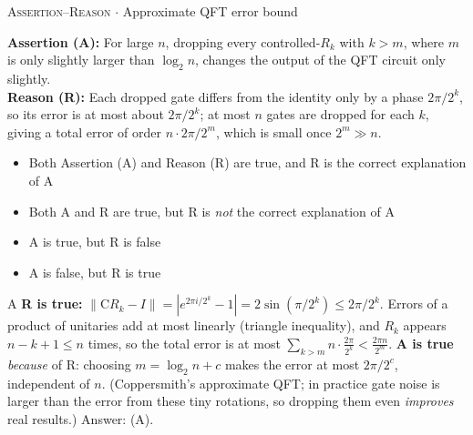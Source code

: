 \documentclass[11pt,a4paper]{article}
\newcommand{\optlabel}[1]{\textbf{(#1)}}
\newcommand{\correctlabel}[1]{\textcolor{okgreen}{\textbf{(#1)}\,\ding{51}}}
\newenvironment{qitem}[1]{\begin{list}{}{\setlength{\leftmargin}{3.3em}\setlength{\labelwidth}{3.1em}%
  \setlength{\labelsep}{0.2em}\setlength{\topsep}{3pt}\setlength{\parsep}{3pt}}\item[\textbf{Q.#1}\hfill]}{\end{list}}
\newcommand{\qsep}{\par\vspace{2pt}{\color{black!15}\hrule}\vspace{4pt}}
\newcommand{\qmeta}[2]{{\footnotesize\color{black!60}\textsc{#1} \;$\cdot$\; #2}\par}
\begin{document}
\begin{qitem}{77}
\qmeta{Assertion--Reason}{Approximate QFT error bound}
\textbf{Assertion (A):} For large $n$, dropping every controlled-$R_k$ with $k > m$, where $m$ is only slightly larger than
$\log_2 n$, changes the output of the QFT circuit only slightly.\\[1mm]
\textbf{Reason (R):} Each dropped gate differs from the identity only by a phase $2\pi/2^{k}$, so its error is at most about
$2\pi/2^{k}$; at most $n$ gates are dropped for each $k$, giving a total error of order $n\cdot 2\pi/2^{m}$, which is small once
$2^m \gg n$.
\begin{itemize}[leftmargin=2.6em, labelsep=0.4em, itemsep=2pt, topsep=3pt]
\item[\correctlabel{A}] Both Assertion (A) and Reason (R) are true, and R is the correct explanation of A
\item[\optlabel{B}] Both A and R are true, but R is \emph{not} the correct explanation of A
\item[\optlabel{C}] A is true, but R is false
\item[\optlabel{D}] A is false, but R is true
\end{itemize}
\end{qitem}
\begin{solbox}{A}
\textbf{R is true:} $\|\mathrm{C}R_k - I\| = |e^{2\pi i/2^k} - 1| = 2\sin(\pi/2^k) \le 2\pi/2^k$. Errors of a product of unitaries add
at most linearly (triangle inequality), and $R_k$ appears $n - k + 1 \le n$ times, so the total error is at most
$\sum_{k > m} n\cdot\frac{2\pi}{2^k} < \frac{2\pi n}{2^{m}}$. \textbf{A is true} \emph{because} of R: choosing $m = \log_2 n + c$ makes the error
at most $2\pi/2^{c}$, independent of $n$. (Coppersmith's approximate QFT; in practice gate noise is larger than the
error from these tiny rotations, so dropping them even \emph{improves} real results.) Answer: (A).
\end{solbox}
\qsep
\end{document}
